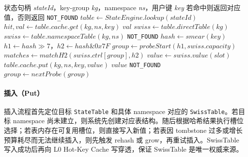 \documentclass[a4paper,11pt]{article}
\begin{document}
\begin{algorithm}[!htbp]
\caption{状态查询算法（含 L0 Hot-Key Cache 快路径）}
\footnotesize
\begin{algorithmic}[1]
\Require 状态句柄 \textit{stateId}，key-group \textit{kg}，namespace \textit{ns}，用户键 \textit{key}
\Ensure 若命中则返回对应值，否则返回 \texttt{NOT\_FOUND}
\State $table \gets StateEngine.lookup(stateId)$
  
  \State $hit, val \gets table.cache.get(kg, ns, key)$
    \State \Return $val$
  \EndIf
\EndIf
{}
  \State $swiss \gets table.directTable(kg)$
\Else
  \State $swiss \gets table.namespaceTable(kg, ns)$
    \State \Return \texttt{NOT\_FOUND}
  \EndIf
\EndIf
\State $hash \gets smear(key)$
\State $h1 \gets hash \gg 7$，$h2 \gets hash \mathbin{\&} 0x7F$
\State $group \gets probeStart(h1, swiss.capacity)$
  \State $matches \gets matchH2(swiss.ctrl[group], h2)$
      \State $value \gets swiss.value(slot)$
        \State $table.cache.put(kg, ns, key, value)$ 
      \EndIf
      \State \Return $value$
    \EndIf
  \EndFor
    \State \Return \texttt{NOT\_FOUND}
  \EndIf
  \State $group \gets nextProbe(group)$
\EndWhile
\end{algorithmic}
\end{algorithm}

\paragraph{插入（Put）}

插入流程首先定位目标 \texttt{StateTable} 和具体 namespace 对应的 \texttt{SwissTable}。若目标 namespace 尚未建立，则系统先创建对应表结构。随后根据哈希结果执行槽位选择；若表内存在可复用槽位，则直接写入新值；若表因 tombstone 过多或增长预算耗尽而无法继续插入，则先触发 rehash 或 grow，再重试插入。SwissTable 写入成功后再向 L0 Hot-Key Cache 写穿透，保证 SwissTable 是唯一权威来源。
\end{document}
